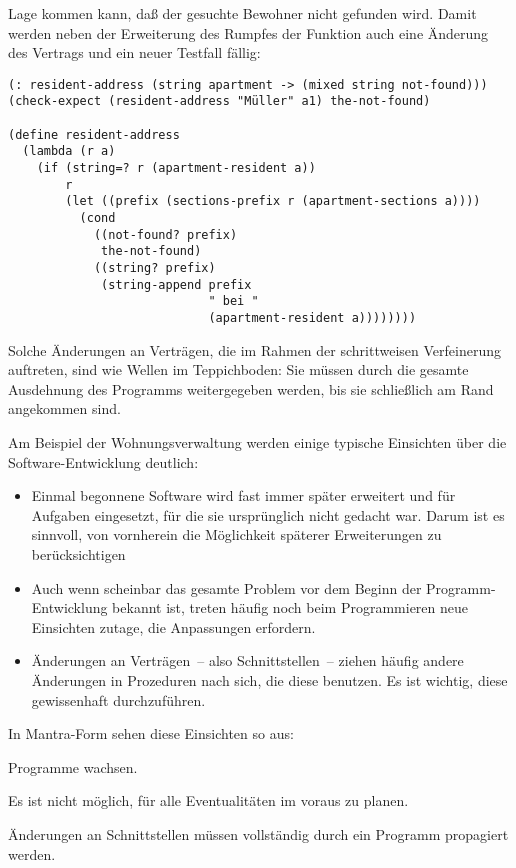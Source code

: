 Lage kommen kann, daß der gesuchte Bewohner nicht gefunden wird.
Damit werden neben der Erweiterung des Rumpfes der Funktion auch eine
Änderung des Vertrags und ein neuer Testfall fällig:
%
\begin{verbatim}
(: resident-address (string apartment -> (mixed string not-found)))
(check-expect (resident-address "Müller" a1) the-not-found)

(define resident-address
  (lambda (r a)
    (if (string=? r (apartment-resident a))
        r
        (let ((prefix (sections-prefix r (apartment-sections a))))
          (cond
            ((not-found? prefix)
             the-not-found)
            ((string? prefix)
             (string-append prefix
                            " bei "
                            (apartment-resident a))))))))
\end{verbatim}
%
Solche Änderungen an Verträgen, die im Rahmen der schrittweisen
Verfeinerung auftreten, sind wie Wellen im Teppichboden:  Sie müssen
durch die gesamte Ausdehnung des Programms weitergegeben werden, bis
sie schließlich am Rand angekommen sind.

Am Beispiel der Wohnungsverwaltung werden einige typische Einsichten
über die Software-Entwicklung deutlich:
%
\begin{itemize}
\item Einmal begonnene Software wird fast immer später erweitert und
  für Aufgaben eingesetzt, für die sie ursprünglich nicht gedacht war.
  Darum ist es sinnvoll, von vornherein die Möglichkeit späterer
  Erweiterungen zu berücksichtigen
\item Auch wenn scheinbar das gesamte Problem vor dem Beginn der
  Programm-Entwicklung bekannt ist, treten häufig noch beim
  Programmieren neue Einsichten zutage, die Anpassungen erfordern.
\item Änderungen an Verträgen~-- also Schnittstellen~-- ziehen häufig
  andere Änderungen in Prozeduren nach sich, die diese benutzen.   Es
  ist wichtig, diese gewissenhaft durchzuführen.
\end{itemize}

In Mantra-Form sehen diese Einsichten so aus:
%
\begin{mantra}
  Programme wachsen.
\end{mantra}

\begin{mantra}
  Es ist nicht möglich, für alle Eventualitäten im voraus zu planen.
\end{mantra}

\begin{mantra}
  Änderungen an Schnittstellen müssen vollständig durch ein Programm
  propagiert werden.
\end{mantra}


